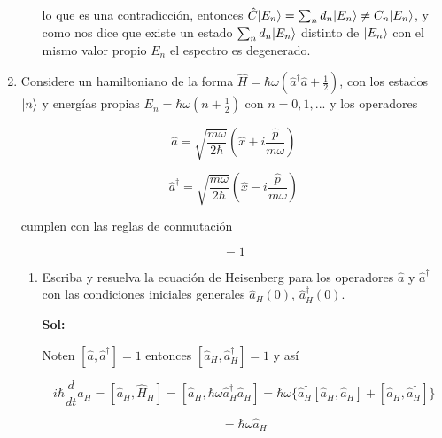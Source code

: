 \documentclass[12pt,a4paper]{article}
\DeclarePairedDelimiter\ket{\lvert}{\rangle}
\begin{document}
\begin{enumerate}
\begin{enumerate}
    lo que es una contradicción, entonces
    $\hat{C} \ket{E_n} = \sum_{n} d_n \ket{E_n} \neq C_n \ket{E_n}$, y como nos dice que existe un estado $\sum_{n} d_n \ket{E_n}$ distinto de $\ket{E_n}$ con el mismo valor propio $E_n$ el espectro es degenerado.
    
    
\end{enumerate}






\item Considere un hamiltoniano de la forma $\hat{H} = \hbar \omega (\hat{a}^{\dagger} \hat{a} + \frac{1}{2})$, con los estados $\ket{n}$ y energías propias $E_n = \hbar \omega (n + \frac{1}{2})$ con $n = 0,1,...$ y los operadores

\begin{equation*}
    \hat{a} = \sqrt{\frac{m\omega}{2 \hbar}} \left(\hat{x}+ i \frac{\hat{p}}{m \omega}\right)
\end{equation*}

\begin{equation*}
    \hat{a}^{\dagger} = \sqrt{\frac{m \omega}{2 \hbar}} \left(\hat{x} - i \frac{\hat{p}}{m \omega}\right)
\end{equation*}

cumplen con las reglas de conmutación

\begin{equation*}
    [\hat{a}, \hat{a}^{\dagger}] = 1
\end{equation*}

\begin{enumerate}
    \item Escriba y resuelva la ecuación de Heisenberg para los operadores $\hat{a}$ y $\hat{a}^{\dagger}$ con las condiciones iniciales generales $\hat{a}_{H}(0)$, $\hat{a}_{H}^{\dagger}(0)$.
    
    \textbf{Sol:}
    
    Noten $[\hat{a}, \hat{a}^{\dagger}] = 1$ entonces $[\hat{a}_{H},\hat{a}_{H}^{\dagger}] = 1$ y así
    
    \begin{equation*}
        i \hbar \frac{d}{dt} \hat{a}_{H} = [\hat{a}_{H}, \hat{H}_{H}] = [\hat{a}_{H}, \hbar \omega \hat{a}_{H}^{\dagger}\hat{a}_{H}]  = \hbar \omega \{\hat{a}_{H}^{\dagger}[\hat{a}_{H},\hat{a}_{H}]+ [\hat{a}_{H}, \hat{a}_{H}^{\dagger}]\}
    \end{equation*}
    
    \begin{equation*}
        = \hbar \omega \hat{a}_{H}
    \end{equation*}
    

\end{enumerate}
\end{enumerate}
\end{document}
